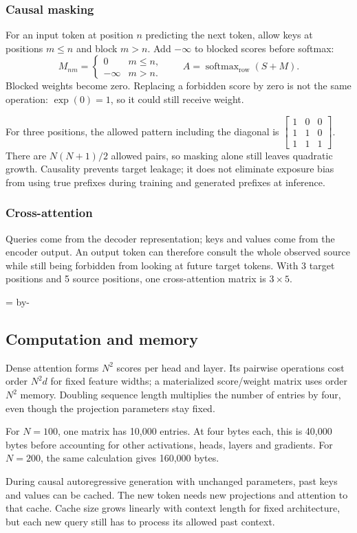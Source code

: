 \documentclass[11pt]{article}
\newcommand{\newsubsection}[1]{\par\begingroup\skip0=\pagegoal\advance\skip0 by-\pagetotal\ifdim\skip0<12\baselineskip\newpage\fi\endgroup\subsection{#1}}
\begin{document}
\subsubsection{Causal masking}
For an input token at position $n$ predicting the next token, allow keys at positions $m\leq n$ and block $m>n$. Add $-\infty$ to blocked scores before softmax:
\[
M_{nm}=\begin{cases}0&m\leq n,\\-\infty&m>n.\end{cases}
\qquad A=\operatorname{softmax}_{\mathrm{row}}(S+M).
\]
Blocked weights become zero. Replacing a forbidden score by zero is not the same operation: $\exp(0)=1$, so it could still receive weight.

For three positions, the allowed pattern including the diagonal is
$\left[\begin{smallmatrix}1&0&0\\1&1&0\\1&1&1\end{smallmatrix}\right]$.
There are $N(N+1)/2$ allowed pairs, so masking alone still leaves quadratic growth. Causality prevents target leakage; it does not eliminate exposure bias from using true prefixes during training and generated prefixes at inference.

\subsubsection{Cross-attention}
Queries come from the decoder representation; keys and values come from the encoder output. An output token can therefore consult the whole observed source while still being forbidden from looking at future target tokens. With 3 target positions and 5 source positions, one cross-attention matrix is $3\times5$.

\newsubsection{Computation and memory}
Dense attention forms $N^2$ scores per head and layer. Its pairwise operations cost order $N^2d$ for fixed feature widths; a materialized score/weight matrix uses order $N^2$ memory. Doubling sequence length multiplies the number of entries by four, even though the projection parameters stay fixed.

For $N=100$, one matrix has 10,000 entries. At four bytes each, this is 40,000 bytes before accounting for other activations, heads, layers and gradients. For $N=200$, the same calculation gives 160,000 bytes.

During causal autoregressive generation with unchanged parameters, past keys and values can be cached. The new token needs new projections and attention to that cache. Cache size grows linearly with context length for fixed architecture, but each new query still has to process its allowed past context.
\end{document}
